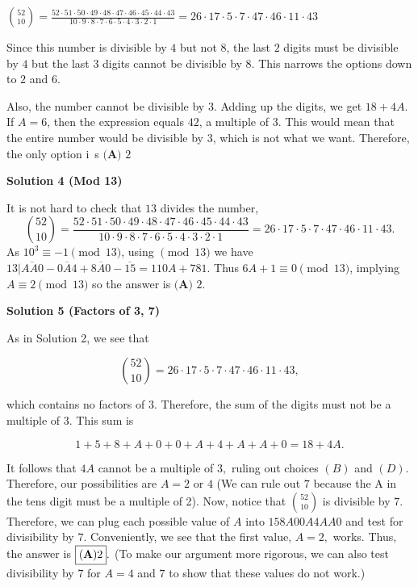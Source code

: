 \begin{enumerate}
$\binom{52}{10}=\frac{52\cdot51\cdot50\cdot49\cdot48\cdot47\cdot46\cdot45\cdot44\cdot43}{10\cdot9\cdot8\cdot7\cdot6\cdot5\cdot4\cdot3\cdot2\cdot1}=26\cdot17\cdot5\cdot7\cdot47\cdot46\cdot11\cdot43$

 Since this number is divisible by $4$ but not $8$, the last $2$ digits must be divisible by $4$ but the last $3$ digits cannot be divisible by $8$. This narrows the options down to $2$ and $6$. 

 Also, the number cannot be divisible by $3$. Adding up the digits, we get $18+4A$. If $A=6$, then the expression equals $42$, a multiple of $3$. This would mean that the entire number would be divisible by $3$, which is not what we want. Therefore, the only option i~s $\boxed{\textbf{(A) }2}$




\textbf{Solution 4 (Mod 13)}

It is not hard to check that $13$ divides the number,
 \[\binom{52}{10}=\frac{52\cdot51\cdot50\cdot49\cdot48\cdot47\cdot46\cdot45\cdot44\cdot43}{10\cdot9\cdot8\cdot7\cdot6\cdot5\cdot4\cdot3\cdot2\cdot1}=26\cdot17\cdot5\cdot7\cdot47\cdot46\cdot11\cdot43.\] As $10^3\equiv-1\pmod{13}$, using $\pmod{13}$ we have $13|\overline{AA0}-\overline{0A4}+\overline{8A0}-\overline{15}=110A+781$. Thus $6A+1\equiv0\pmod{13}$, implying $A\equiv2\pmod{13}$ so the answer is $\boxed{\textbf{(A) }2}$.

 



\textbf{Solution 5 (Factors of 3, 7)}

As in Solution 2, we see that 

 
 \[\binom{52}{10}=26\cdot17\cdot5\cdot7\cdot47\cdot46\cdot11\cdot43,\] 

 which contains no factors of $3.$ Therefore, the sum of the digits must not be a multiple of $3.$ This sum is

 
 \[1+5+8+A+0+0+A+4+A+A+0=18+4A.\]

 It follows that $4A$ cannot be a multiple of $3,$ ruling out choices $(B)$ and $(D).$ Therefore, our possibilities are $A=2$ or $4$ (We can rule out $7$ because the A in the tens digit must be a multiple of 2). Now, notice that $\binom{52}{10}$ is divisible by $7.$ Therefore, we can plug each possible value of $A$ into $158A00A4AA0$ and test for divisibility by $7.$ Conveniently, we see that the first value, $A=2,$ works. Thus, the answer is $\boxed{\bold{(A)} 2}.$ (To make our argument more rigorous, we can also test divisibility by $7$ for $A=4$ and $7$ to show that these values do not work.)


\end{enumerate}
